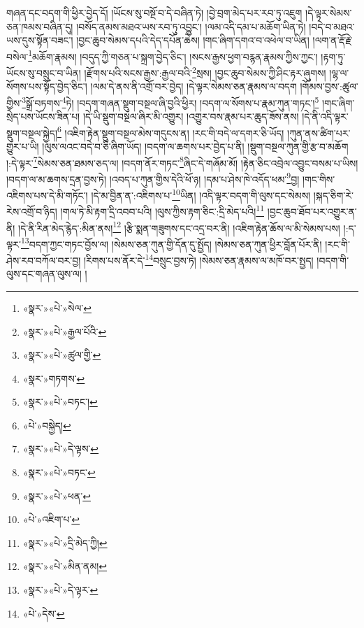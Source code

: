གཞན་དང་བདག་གི་ཕྱིར་བྱེད་དོ། །ཡོངས་སུ་བསྔོ་བ་དེ་བཞིན་ཏེ། །བྱེ་བྲག་མེད་པར་རབ་ཏུ་འཇུག །དེ་ལྟར་སེམས་ཅན་ཁམས་བཞིན་དུ། །བསོད་ནམས་མཐའ་ཡས་རབ་ཏུ་འབྱུང་། །ལམ་འདི་དམ་པ་མཆོག་ཡིན་ཏེ། །བདེ་བ་མཐའ་ཡས་དུས་སྟོན་བཟང་། །བྱང་ཆུབ་སེམས་དཔའི་དེད་དཔོན་ཆེས། །གང་ཞིག་དགའ་བ་འཕེལ་བ་ཡིན། །ལག་ན་རྡོ་རྗེ་བསེལ་\footnote{«སྣར་»«པེ་»སེལ་}མཆོག་རྣམས། །བདུད་ཀྱི་གཅན་པ་སྐྲག་བྱེད་ཅིང་། །སངས་རྒྱས་ཕྱག་བརྙན་རྣམས་ཀྱིས་ཀྱང་། །རྟག་ཏུ་ཡོངས་སུ་བསྲུང་བ་ཡིན། །རྫོགས་པའི་སངས་རྒྱས་:རྒྱལ་བའི་\footnote{«སྣར་»«པེ་»རྒྱལ་པོའི་}སྲས། །བྱང་ཆུབ་སེམས་ཀྱི་ཤིང་རྟར་ཞུགས། །ལྷ་ལ་སོགས་པས་སྟོད་བྱེད་ཅིང་། །ལམ་དེ་ནས་ནི་འགྲོ་བར་བྱེད། །དེ་ལྟར་སེམས་ཅན་རྣམས་ལ་བདག །གོམས་བྱས་:ཚུལ་གྱིས་\footnote{«སྣར་»«པེ་»ཚུལ་གྱི་}སྒྲོ་བཏགས་\footnote{«སྣར་»གཏགས་}ཏེ། །བདག་གཞན་སྡུག་བསྔལ་ཞི་བྱའི་ཕྱིར། །བདག་ལ་སོགས་པ་རྣམ་ཀུན་གཏང་།\footnote{«སྣར་»«པེ་»བཏང་།} །གང་ཞིག་སྲེད་པས་ཡོངས་ཟིན་པ། །དེ་ཡི་སྡུག་བསྔལ་ཞིར་མི་འགྱུར། །འགྱུར་བས་རྣམ་པར་ཆུད་ཟོས་ནས། །དེ་ནི་འདི་ལྟར་སྡུག་བསྔལ་སྐྱེད།\footnote{«པེ་»བསྐྱེད།} །འཇིག་རྟེན་སྡུག་བསྔལ་མེས་གདུངས་ན། །རང་གི་བདེ་ལ་དགར་ཅི་ཡོད། །ཀུན་ནས་ཚིག་པར་གྱུར་པ་ཡི། །ལུས་ལའང་བདེ་བ་ཅི་ཞིག་ཡོད། །བདག་ལ་ཆགས་པར་བྱེད་པ་ནི། །སྡུག་བསྔལ་ཀུན་གྱི་རྩ་བ་མཆོག །:དེ་ལྟར་\footnote{«སྣར་»«པེ་»དེ་ལྟས་}སེམས་ཅན་ཐམས་ཅད་ལ། །བདག་ནོར་གཏང་\footnote{«སྣར་»«པེ་»བཏང་}ཞིང་དེ་གཞོམ་མོ། །རྟེན་ཅིང་འབྲེལ་འབྱུང་བསམ་པ་ཡིས། །བདག་ལ་མ་ཆགས་དྲན་བྱས་ཏེ། །འབད་པ་ཀུན་གྱིས་དེའི་ཕོ་ཉ། །དམ་པ་ཤེས་ཁེ་འདོད་ཕམ་\footnote{«སྣར་»«པེ་»ཕན་}བྱ། །གང་གིས་འཇིགས་པས་དེ་མི་གཏོང་། །དེ་མ་བྱིན་ན་:འཇིགས་པ་\footnote{«པེ་»འཇིག་པ་}ཡིན། །འདི་ལྟར་བདག་གི་ལུས་དང་སེམས། །སྐད་ཅིག་རེ་རེས་འགྲོ་བ་ཉིད། །གལ་ཏེ་མི་རྟག་དྲི་འབབ་པའི། །ལུས་ཀྱིས་རྟག་ཅིང་:དྲི་མེད་པའི།\footnote{«སྣར་»«པེ་»དྲི་མེད་ཀྱི།} །བྱང་ཆུབ་ཐོབ་པར་འགྱུར་ན་ནི། །དེ་ནི་རིན་མེད་རྙེད་:མིན་ནས།\footnote{«སྣར་»«པེ་»མིན་ནམ།} །རྩི་སྨན་གཟུགས་དང་འདྲ་བར་ནི། །འཇིག་རྟེན་ཆོས་ལ་མི་སེམས་པས། །:ད་ལྟར་\footnote{«སྣར་»«པེ་»དེ་ལྟར་}བདག་ཀྱང་གཏང་བྱོས་ལ། །སེམས་ཅན་ཀུན་གྱི་དོན་དུ་སྤྱོད། །སེམས་ཅན་ཀུན་ཕྱིར་བློན་པོར་ནི། །རང་གི་ཤེས་རབ་བཀོལ་བར་བྱ། །རིགས་པས་ནོར་དེ་\footnote{«པེ་»དེས་}བསྲུང་བྱས་ཏེ། །སེམས་ཅན་རྣམས་ལ་མཁོ་བར་སྤྱད། །བདག་གི་ལུས་དང་གཞན་ལུས་ལ། །
